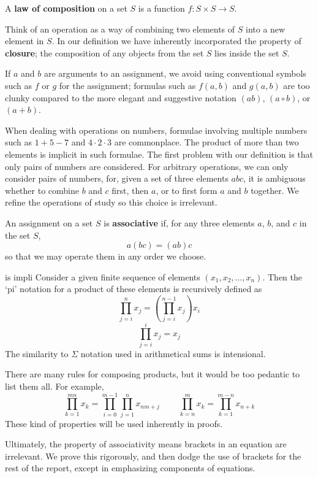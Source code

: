 \begin{definition} A {\bf law of composition} on a set $S$ is a function $f: S \times S \to S$. \end{definition}

Think of an operation as a way of combining two elements of $S$ into a new element in $S$. In our definition we have inherently incorporated the property of {\bf closure}; the composition of any objects from the set $S$ lies inside the set $S$.

If $a$ and $b$ are arguments to an assignment, we avoid using conventional symbols such as $f$ or $g$ for the assignment; formulas such as $f(a,b)$ and $g(a,b)$ are too clunky compared to the more elegant and suggestive notation $(ab)$, $(a \circ b)$, or $(a + b)$.

When dealing with operations on numbers, formulae involving multiple numbers such as $1 + 5 - 7$ and $4 \cdot 2 \cdot 3$ are commonplace. The product of more than two elements is implicit in such formulae. The first problem with our definition is that only pairs of numbers are considered. For arbitrary operations, we can only consider pairs of numbers, for, given a set of three elements $abc$, it is ambiguous whether to combine $b$ and $c$ first, then $a$, or to first form $a$ and $b$ together. We refine the operations of study so this choice is irrelevant.

\begin{definition}
    An assignment on a set $S$ is {\bf associative} if, for any three elements $a$, $b$, and $c$ in the set $S$,
    \[ a(bc) = (ab)c \]
    so that we may operate them in any order we choose.
\end{definition}
is impli
Consider a given finite sequence of elements $(x_1,x_2, \dots, x_n)$. Then the `pi' notation for a product of these elements is recursively defined as
%
\[ \prod_{j = i}^n x_j = \left( \prod_{j = i}^{n-1} x_j \right) x_i \]
\[ \prod_{j = i}^i x_j = x_j \]
%
The similarity to $\Sigma$ notation used in arithmetical sums is intensional.

There are many rules for composing products, but it would be too pedantic to list them all. For example,
%
\[ \prod_{k = 1}^{mn} x_k = \prod_{i = 0}^{m-1} \prod_{j = 1}^n x_{nm + j}\ \ \ \ \ \ \ \ \ \ \prod_{k = n}^m x_k = \prod_{k = 1}^{m-n} x_{n + k} \]
%
These kind of properties will be used inherently in proofs.

Ultimately, the property of associativity means brackets in an equation are irrelevant. We prove this rigorously, and then dodge the use of brackets for the rest of the report, except in emphasizing components of equations.

